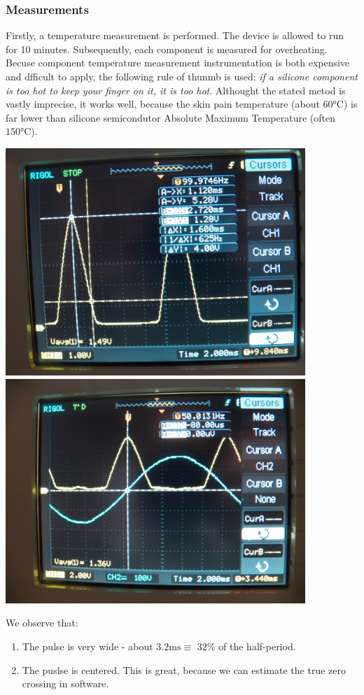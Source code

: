 \subsubsection{Measurements}
Firstly, a temperature measurement is performed.
The device is allowed to run for 10 minutes.
Subsequently, each component is measured for overheating.
Becuse component temperature measurement instrumentation is both expensive and dfficult to apply, the following rule of thunmb is used:
\textit{if a silicone component is too hot to keep your finger on it, it is too hot}.
Althought the stated metod is vastly imprecise, it works well, because the skin pain temperature (about $60\si{\celsius}$) is far lower than silicone semicondutor Absolute Maximum Temperature (often $150\si{\celsius}$).
\par
\includegraphics[width=0.85\textwidth]{../images/ZCD_scope1}~
\\
\includegraphics[width=0.85\textwidth]{../images/ZCD_scope2}~
\par
We observe that:
\begin{enumerate}
\item{The pulse is very wide - about $3.2\si{\milli\second} \equiv$ 32\% of the half-period.}
\item{The puslse is centered. This is great, because we can estimate the true zero crossing in software.}
\end{enumerate}

